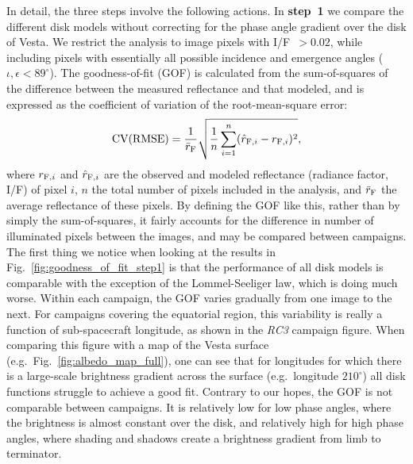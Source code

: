 \documentclass[3p,authoryear]{elsarticle}
\begin{document}
In detail, the three steps involve the following actions. In {\bf step~1} we compare the different disk models without correcting for the phase angle gradient over the disk of Vesta. We restrict the analysis to image pixels with I/F~$> 0.02$, while including pixels with essentially all possible incidence and emergence angles ($\iota, \epsilon < 89^\circ$). The goodness-of-fit (GOF) is calculated from the sum-of-squares of the difference between the measured reflectance and that modeled, and is expressed as the coefficient of variation of the root-mean-square error:
\begin{equation}
{\rm CV(RMSE)} = \frac{1}{\bar{r}_{\rm F}} \sqrt{\frac{1}{n} \sum\limits_{i=1}^n (\hat{r}_{{\rm F},i} - r_{{\rm F},i})^2},
\label{eq:GOF}
\end{equation}
where $r_{{\rm F},i}$ and $\hat{r}_{{\rm F},i}$ are the observed and modeled reflectance (radiance factor, I/F) of pixel $i$, $n$ the total number of pixels included in the analysis, and $\bar{r}_{\rm F}$ the average reflectance of these pixels. By defining the GOF like this, rather than by simply the sum-of-squares, it fairly accounts for the difference in number of illuminated pixels between the images, and may be compared between campaigns. The first thing we notice when looking at the results in Fig.~\ref{fig:goodness_of_fit_step1} is that the performance of all disk models is comparable with the exception of the Lommel-Seeliger law, which is doing much worse. Within each campaign, the GOF varies gradually from one image to the next. For campaigns covering the equatorial region, this variability is really a function of sub-spacecraft longitude, as shown in the {\it RC3} campaign figure. When comparing this figure with a map of the Vesta surface (e.g.\ Fig.~\ref{fig:albedo_map_full}), one can see that for longitudes for which there is a large-scale brightness gradient across the surface (e.g.\ longitude $210^\circ$) all disk functions struggle to achieve a good fit. Contrary to our hopes, the GOF is not comparable between campaigns. It is relatively low for low phase angles, where the brightness is almost constant over the disk, and relatively high for high phase angles, where shading and shadows create a brightness gradient from limb to terminator.
\end{document}

